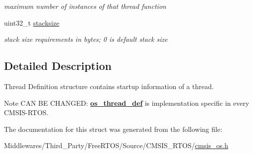 \begin{DoxyCompactItemize}
\begin{DoxyCompactList}\small\item\em maximum number of instances of that thread function \end{DoxyCompactList}\item 
\mbox{\label{structos__thread__def_a950b7f81ad4711959517296e63bc79d1}} 
uint32\+\_\+t \mbox{\hyperlink{structos__thread__def_a950b7f81ad4711959517296e63bc79d1}{stacksize}}
\begin{DoxyCompactList}\small\item\em stack size requirements in bytes; 0 is default stack size \end{DoxyCompactList}\end{DoxyCompactItemize}


\subsection{Detailed Description}
Thread Definition structure contains startup information of a thread. \begin{DoxyNote}{Note}
C\+AN BE C\+H\+A\+N\+G\+ED\+: {\bfseries \mbox{\hyperlink{structos__thread__def}{os\+\_\+thread\+\_\+def}}} is implementation specific in every C\+M\+S\+I\+S-\/\+R\+T\+OS. 
\end{DoxyNote}


The documentation for this struct was generated from the following file\+:\begin{DoxyCompactItemize}
\item 
Middlewares/\+Third\+\_\+\+Party/\+Free\+R\+T\+O\+S/\+Source/\+C\+M\+S\+I\+S\+\_\+\+R\+T\+O\+S/\mbox{\hyperlink{cmsis__os_8h}{cmsis\+\_\+os.\+h}}\end{DoxyCompactItemize}
